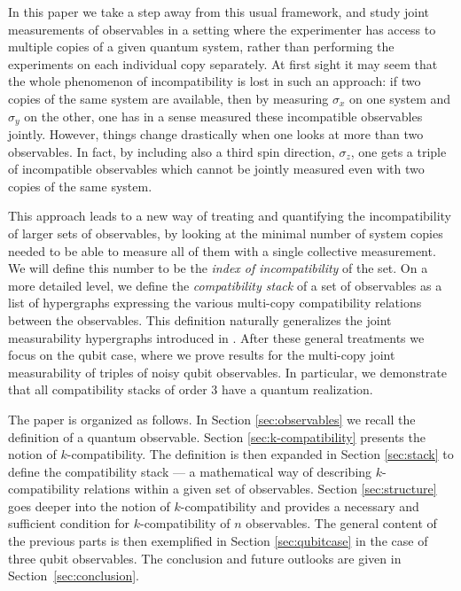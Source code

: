 \documentclass[12pt]{amsart}
\theoremstyle{definition}
\begin{document}
In this paper we take a step away from this usual framework, and study joint measurements of observables in a setting where the experimenter has access to multiple copies of a given quantum system, rather than performing the experiments on each individual copy separately. At first sight it may seem that the whole phenomenon of incompatibility is lost in such an approach: if two copies of the same system are available, then by measuring $\sigma_x$ on one system and $\sigma_y$ on the other, one has in a sense measured these incompatible observables jointly. However, things change drastically when one looks at more than two observables. In fact, by including also a third spin direction, $\sigma_z$, one gets a triple of incompatible observables which cannot be jointly measured even with two copies of the same system.  


This approach leads to a new way of treating and quantifying the incompatibility of larger sets of observables, by looking at the minimal number of system copies needed to be able to measure all of them with a single collective measurement. We will define this number to be the {\em index of incompatibility} of the set. On a more detailed level, we define the {\em compatibility stack} of a set of observables as a list of hypergraphs expressing the various multi-copy compatibility relations between the observables. This definition naturally generalizes the joint measurability hypergraphs introduced in \cite{KuHeFr14}. After these general treatments we focus on the qubit case, where we prove results for the multi-copy joint measurability of triples of noisy qubit observables. In particular, we demonstrate that all compatibility stacks of order 3 have a quantum realization.

The paper is organized as follows. In Section \ref{sec:observables} we recall the definition of a quantum observable. Section \ref{sec:k-compatibility}  presents the notion of $k$-compatibility. The definition is then expanded in Section \ref{sec:stack}  to define the compatibility stack --- a mathematical way of describing $k$-compatibility relations within a given set of observables. Section \ref{sec:structure}  goes deeper into the notion of $k$-compatibility and provides a necessary and sufficient condition for $k$-compatibility of $n$ observables. The general content of the previous parts is then exemplified in Section \ref{sec:qubitcase} in the case of three qubit observables.
The conclusion and future outlooks are given in Section~\ref{sec:conclusion}.
\end{document}
